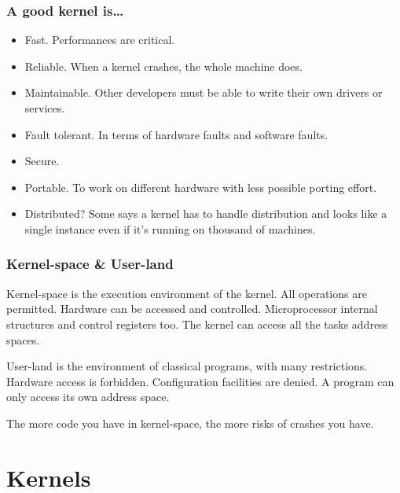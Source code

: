 
\begin{frame}
  \frametitle{A good kernel is\ldots}

  \begin{itemize}
  \item
    Fast. Performances are critical.
  \item
    Reliable. When a kernel crashes, the whole machine does.
  \item
    Maintainable. Other developers must be able to write their own drivers or services.
  \item
    Fault tolerant. In terms of hardware faults and software faults.
  \item
    Secure.
  \item
    Portable. To work on different hardware with less possible porting effort.
  \item
    Distributed? Some says a kernel has to handle distribution and looks like a single instance even if it's running on thousand of machines.
  \end{itemize}

\end{frame}



\begin{frame}
  \frametitle{Kernel-space \& User-land}

  Kernel-space is the execution environment of the kernel. All operations are permitted. Hardware can be accessed and controlled. Microprocessor internal structures and control registers too. The kernel can access all the tasks address spaces.

  \-

  User-land is the environment of classical programs, with many restrictions. Hardware access is forbidden. Configuration facilities are denied. A program can only access its own address space.

  \-

  The more code you have in kernel-space, the more risks of crashes you
  have.

\end{frame}

%
%

\section{Kernels}


